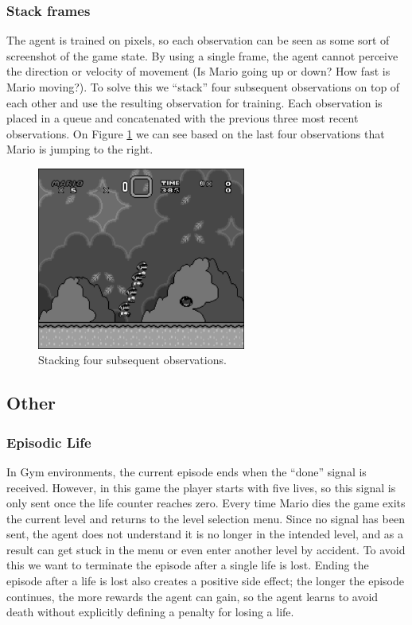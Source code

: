 \documentclass[a4paper]{article}
\begin{document}
\subsubsection{Stack frames}
The agent is trained on pixels, so each observation can be seen as some sort of screenshot of the game state.
By using a single frame, the agent cannot perceive the direction or velocity of movement (Is Mario going up or down? How fast is Mario moving?).
To solve this we ``stack'' four subsequent observations on top of each other and use the resulting observation for training.
Each observation is placed in a queue and concatenated with the previous three most recent observations.
On Figure \ref{fig:stack} we can see based on the last four observations that Mario is jumping to the right.
\begin{figure}[htbp]
    \centering
    \includegraphics[height=6cm]{stacked}
    \caption{Stacking four subsequent observations.}
    \label{fig:stack}
\end{figure}

\subsection{Other}
\subsubsection{Episodic Life}
In Gym environments, the current episode ends when the ``done'' signal is received.
However, in this game the player starts with five lives, so this signal is only sent once the life counter reaches zero.
Every time Mario dies the game exits the current level and returns to the level selection menu.
Since no signal has been sent, the agent does not understand it is no longer in the intended level, and as a result can get stuck in the menu or even enter another level by accident.
To avoid this we want to terminate the episode after a single life is lost.
Ending the episode after a life is lost also creates a positive side effect; the longer the episode continues, the more rewards the agent can gain, so the agent learns to avoid death without explicitly defining a penalty for losing a life.
\end{document}
